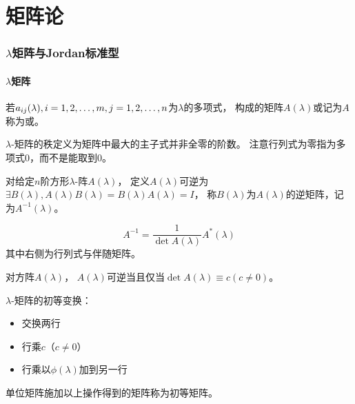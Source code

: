 \part{矩阵论}
\section{$\lambda$矩阵与Jordan标准型}
\subsection{$\lambda$矩阵}

\begin{definition}
    若$a_{ij}(\lambda),i=1,2,\dots,m,\linebreak[1]j=1,2,\dots,n$为$\lambda$的多项式，
    构成的矩阵$A(\lambda)$或记为$A$称为或。
\end{definition}

\begin{definition}[秩]
    $\lambda$-矩阵的秩定义为矩阵中最大的主子式并非全零的阶数。
    注意行列式为零指为多项式$0$，而不是能取到$0$。
\end{definition}

\begin{definition}[可逆~逆矩阵]
    对给定$n$阶方形$\lambda$-阵$A(\lambda)$，
    定义$A(\lambda)$可逆为$\exists B(\lambda),A(\lambda)B(\lambda)=B(\lambda)A(\lambda)=I$，
    称$B(\lambda)$为$A(\lambda)$的逆矩阵，记为$A^{-1}(\lambda)$。
\end{definition}

\begin{theorem}
    \[
        A^{-1}=\frac{1}{\det A(\lambda)} A^{*}(\lambda)
    \]
    其中右侧为行列式与伴随矩阵。
\end{theorem}

\begin{corollary}
    对方阵$A(\lambda)$，
    $A(\lambda)$可逆当且仅当$\det A(\lambda) \equiv c (c\neq 0)$。
\end{corollary}

\begin{definition}
    $\lambda$-矩阵的初等变换：
    \begin{itemize}
        \item 交换两行
        \item 行乘$c$（$c\neq 0$）
        \item 行乘以$\phi(\lambda)$加到另一行
    \end{itemize}
    单位矩阵施加以上操作得到的矩阵称为初等矩阵。
\end{definition}

